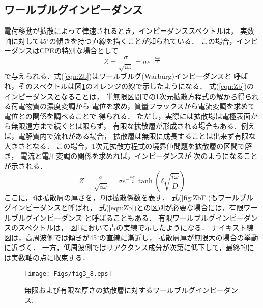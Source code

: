 \subsection{ワールブルグインピーダンス}
電荷移動が拡散によって律速されるとき，インピーダンススペクトルは，
実数軸に対して45$^\circ$の傾きを持つ直線を描くことが知られている．
この場合，インピーダンスはCPEの特別な場合として
\begin{equation}
	Z=\frac{\sigma}{\sqrt{i\omega}}=\sigma e^{-\frac{i\omega p}{2}}
	\label{eqn:Zb}
\end{equation}
で与えられる．式(\ref{eqn:Zb})はワールブルグ(Warburg)インピーダンスと
呼ばれ，そのスペクトルは図\ref{fig:fig3_8}のオレンジの線で示したようになる．
式(\ref{eqn:Zb})のインピーダンスとなることは，
半無限区間での1次元拡散方程式の解から得られる荷電物質の濃度変調から
電位を求め，質量フラックスから電流変調を求めて電位との関係を調べることで
得られる．
ただし，実際には拡散場は電極表面から無限遠方まで続くとは限らず，
有限な拡散層が形成される場合もある．例えば，電解質内で流れがある場合，
拡散層は無限に成長することは出来ず有限な大きさとなる．
この場合，1次元拡散方程式の境界値問題を拡散層の区間で解き，
電流と電圧変調の関係を求めれば，インピーダンスが
次のようになることが示される．
\begin{equation}
	Z=\frac{\sigma}{\sqrt{i\omega}}=\sigma e^{-\frac{i\omega p}{2}}
	\tanh \left( \delta \sqrt{\frac{i\omega}{D}}\right)
	\label{eqn:ZbF}
\end{equation}
ここに，$\delta$は拡散層の厚さを，$D$は拡散係数を表す．
式(\ref{fig:ZbF})もワールブルグインピーダンスと呼ばれ，
式(\ref{eqn:Zb})との区別が必要な場合には，有限ワールブルグインピーダンス
と呼ばることもある．
有限ワールブルグインピーダンスのスペクトルは，
図\ref{fig:fig3_8}において青の実線で示したようになる．
ナイキスト線図は，高周波側では傾きが45$^\circ$の直線に漸近し，
拡散層厚が無限大の場合の挙動に近づく．
一方，低周波側ではリアクタンス成分が次第に低下して，最終的には実数軸の点に収束する．
\begin{figure}[h]
	\begin{center}
	\texttt{[image: Figs/fig3\_8.eps]} 
	\end{center}
	\caption{
		無限および有限な厚さの拡散層に対するワールブルグインピーダンス.
	} 
	\label{fig:fig3_8}
\end{figure}
